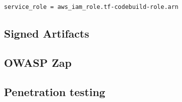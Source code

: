 \begin{tcolorbox}
\begin{verbatim}
service_role = aws_iam_role.tf-codebuild-role.arn
\end{verbatim}
\end{tcolorbox}


\subsection{Signed Artifacts}


\subsection{OWASP Zap}


\subsection{Penetration testing}



